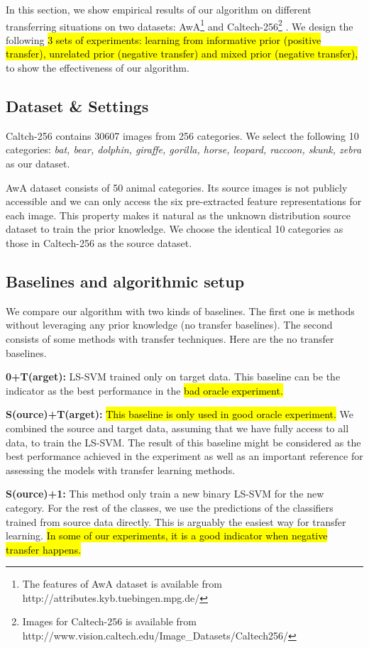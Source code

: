 In this section, we show empirical results of our algorithm on different transferring situations on two datasets: AwA\footnote{The features of AwA dataset is available from http://attributes.kyb.tuebingen.mpg.de/} \cite{lampert2009learning} and Caltech-256\footnote{Images for Caltech-256 is available from http://www.vision.caltech.edu/Image\_Datasets/Caltech256/} \cite{griffin2007caltech}. We design the following \hl{3 sets of experiments: learning from informative prior (positive transfer), unrelated prior (negative transfer) and mixed prior (negative transfer), } to show the effectiveness of our algorithm.
\subsection{Dataset \& Settings}
Caltch-256 contains 30607 images from 256 categories. We select the following 10 categories: \textit{bat, bear, dolphin, giraffe, gorilla, horse, leopard, raccoon, skunk, zebra} as our dataset.

AwA dataset consists of 50 animal categories. Its source images is not publicly accessible and we can only access the six pre-extracted feature representations for each image. This property makes it natural as the unknown distribution source dataset to train the prior knowledge. We choose the identical 10 categories as those in Caltech-256 as the source dataset.

\subsection{Baselines and algorithmic setup}
We compare our algorithm with two kinds of baselines. The first one is methods without leveraging any prior knowledge (no transfer baselines). The second consists of some methods with transfer techniques. Here are the no transfer baselines. 

\textbf{0+T(arget):} LS-SVM trained only on target data. This baseline can be the indicator as the best performance in the \hl{bad oracle experiment.}

\textbf{S(ource)+T(arget):} \hl{This baseline is only used in good oracle experiment.} We combined the source and target data, assuming that we have fully access to all data, to train the LS-SVM. The result of this baseline might be considered as the best performance achieved in the experiment as well as an important reference for assessing the models with transfer learning methods.

\textbf{S(ource)+1:} This method only train a new binary LS-SVM for the new category. For the rest of the classes, we use the predictions of the classifiers trained from source data directly. This is arguably the easiest way for transfer learning. \hl{In some of our experiments, it is a good indicator when negative transfer happens.} 

